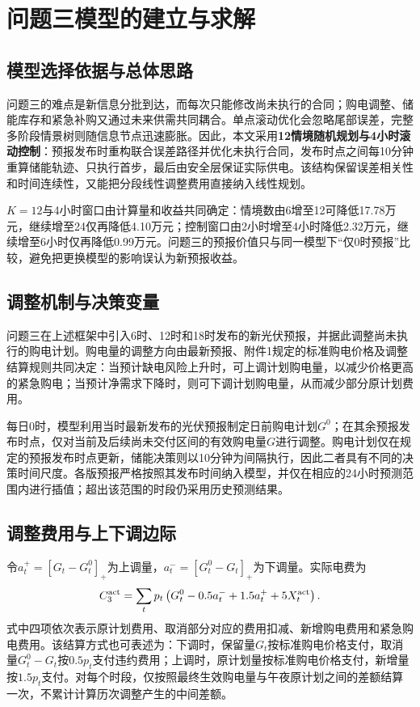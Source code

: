 \documentclass[UTF8,fontset=none,12pt,a4paper]{ctexart}
\begin{document}
\section{问题三模型的建立与求解}
\subsection{模型选择依据与总体思路}
问题三的难点是新信息分批到达，而每次只能修改尚未执行的合同；购电调整、储能库存和紧急补购又通过未来供需共同耦合。单点滚动优化会忽略尾部误差，完整多阶段情景树则随信息节点迅速膨胀。因此，本文采用\textbf{12情境随机规划与4小时滚动控制}：预报发布时重构联合误差路径并优化未执行合同，发布时点之间每10分钟重算储能轨迹、只执行首步，最后由安全层保证实际供电。该结构保留误差相关性和时间连续性，又能把分段线性调整费用直接纳入线性规划\cite{shapiro,rawlings,parisio}。

$K=12$与4小时窗口由计算量和收益共同确定：情境数由6增至12可降低17.78万元，继续增至24仅再降低4.10万元；控制窗口由2小时增至4小时降低2.32万元，继续增至6小时仅再降低0.99万元。问题三的预报价值只与同一模型下“仅0时预报”比较，避免把更换模型的影响误认为新预报收益。

\subsection{调整机制与决策变量}
问题三在上述框架中引入6时、12时和18时发布的新光伏预报，并据此调整尚未执行的购电计划。购电量的调整方向由最新预报、附件1规定的标准购电价格及调整结算规则共同决定：当预计缺电风险上升时，可上调计划购电量，以减少价格更高的紧急购电；当预计净需求下降时，则可下调计划购电量，从而减少部分原计划费用。

每日0时，模型利用当时最新发布的光伏预报制定日前购电计划$G^0$；在其余预报发布时点，仅对当前及后续尚未交付区间的有效购电量$G$进行调整。购电计划仅在规定的预报发布时点更新，储能决策则以10分钟为间隔执行，因此二者具有不同的决策时间尺度。各版预报严格按照其发布时间纳入模型，并仅在相应的24小时预测范围内进行插值；超出该范围的时段仍采用历史预测结果。

\subsection{调整费用与上下调边际}
令$a_t^+=\left[G_t-G_t^0\right]_+$为上调量，$a_t^-=\left[G_t^0-G_t\right]_+$为下调量。实际电费为
\begin{equation}
 C_3^{\rm act}=\sum_t p_t\left(G_t^0-0.5a_t^-+1.5a_t^++5X_t^{\rm act}\right).
 \label{eq:cost3}
\end{equation}
式中四项依次表示原计划费用、取消部分对应的费用扣减、新增购电费用和紧急购电费用。该结算方式也可表述为：下调时，保留量$G_t$按标准购电价格支付，取消量$G_t^0-G_t$按$0.5p_t$支付违约费用；上调时，原计划量按标准购电价格支付，新增量按$1.5p_t$支付。对每个时段，仅按照最终生效购电量与午夜原计划之间的差额结算一次，不累计计算历次调整产生的中间差额。
\end{document}
